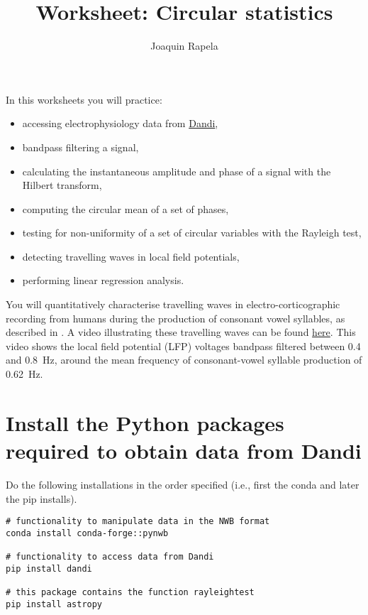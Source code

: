 \documentclass[12pt]{article}
\title{Worksheet: Circular statistics}
\author{Joaquin Rapela}
\begin{document}
\maketitle

In this worksheets you will practice:

\begin{itemize}

    \item accessing electrophysiology data from
        \href{https://dandiarchive.org/}{Dandi},

    \item bandpass filtering a signal,

    \item calculating the instantaneous amplitude and phase of a signal with
        the Hilbert transform,

    \item computing the circular mean of a set of phases,

    \item testing for non-uniformity of a set of circular variables with the
        Rayleigh test,

    \item detecting travelling waves in local field potentials,

    \item performing linear regression analysis.

\end{itemize}

You will quantitatively characterise travelling waves in electro-corticographic
recording from humans during the production of consonant vowel syllables, as
described in
\citet{rapelaInPrepTWsInSpeech,rapelaInPrepSyncTWs,rapelaInPrepSyncTWsII}. A
video illustrating these travelling waves can be found
\href{https://www.youtube.com/watch?v=6QYUGRqZ7Hc}{here}. This video shows the
local field potential (LFP) voltages bandpass filtered between 0.4 and 0.8~Hz,
around the mean frequency of consonant-vowel syllable production of 0.62~Hz.

\section{Install the Python packages required to obtain data from Dandi}

Do the following installations in the order specified (i.e., first the conda
and later the pip installs).

\begin{verbatim}
# functionality to manipulate data in the NWB format
conda install conda-forge::pynwb

# functionality to access data from Dandi
pip install dandi

# this package contains the function rayleightest
pip install astropy

\end{verbatim}
\end{document}
